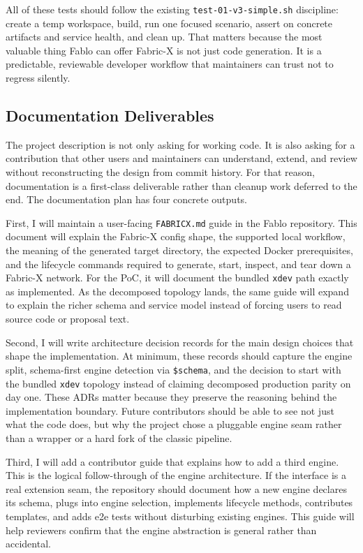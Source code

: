 All of these tests should follow the existing \texttt{test-01-v3-simple.sh} discipline: create a temp workspace, build, run one focused scenario, assert on concrete artifacts and service health, and clean up. That matters because the most valuable thing Fablo can offer Fabric-X is not just code generation. It is a predictable, reviewable developer workflow that maintainers can trust not to regress silently.

\subsection{Documentation Deliverables}

The project description is not only asking for working code. It is also asking for a contribution that other users and maintainers can understand, extend, and review without reconstructing the design from commit history. For that reason, documentation is a first-class deliverable rather than cleanup work deferred to the end. The documentation plan has four concrete outputs.

First, I will maintain a user-facing \texttt{FABRICX.md} guide in the Fablo repository. This document will explain the Fabric-X config shape, the supported local workflow, the meaning of the generated target directory, the expected Docker prerequisites, and the lifecycle commands required to generate, start, inspect, and tear down a Fabric-X network. For the PoC, it will document the bundled \texttt{xdev} path exactly as implemented. As the decomposed topology lands, the same guide will expand to explain the richer schema and service model instead of forcing users to read source code or proposal text.

Second, I will write architecture decision records for the main design choices that shape the implementation. At minimum, these records should capture the engine split, schema-first engine detection via \texttt{\$schema}, and the decision to start with the bundled \texttt{xdev} topology instead of claiming decomposed production parity on day one. These ADRs matter because they preserve the reasoning behind the implementation boundary. Future contributors should be able to see not just what the code does, but why the project chose a pluggable engine seam rather than a wrapper or a hard fork of the classic pipeline.

Third, I will add a contributor guide that explains how to add a third engine. This is the logical follow-through of the engine architecture. If the interface is a real extension seam, the repository should document how a new engine declares its schema, plugs into engine selection, implements lifecycle methods, contributes templates, and adds e2e tests without disturbing existing engines. This guide will help reviewers confirm that the engine abstraction is general rather than accidental.

